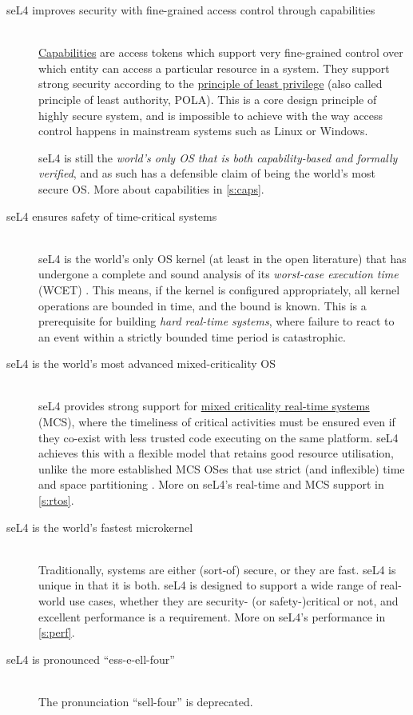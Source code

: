 \documentclass[english,a4paper,12pt]{report}
\newcommand{\Break}{\ \nopagebreak\\}
\begin{document}
\begin{description}
  \item[seL4 improves security with fine-grained access control
    through capabilities]\Break
    \href{https://en.wikipedia.org/wiki/Capability-based_security}{Capabilities}
    are access tokens which support very fine-grained control over which
    entity can access a particular resource in a system. They support
    strong security according to the
    \href{https://en.wikipedia.org/wiki/Principle_of_least_privilege}{principle
      of least privilege} (also called principle of least authority,
    POLA). This is a core design principle of highly secure system,
    and is impossible to achieve with the way access control happens
    in mainstream systems such as Linux or Windows.

    seL4 is still the \emph{world's only OS that is both
      capability-based and formally verified}, and as such has a
    defensible claim of being the world's most secure OS. More about capabilities
    in \autoref{s:caps}.

  \item[seL4 ensures safety of time-critical systems] \Break%
    seL4 is the world's only OS kernel (at least in the open
    literature) that has undergone a complete and sound analysis of
    its \emph{worst-case execution time} (WCET)
    \citep{Blackham_SCRH_11, Sewell_KH_17}. This means,
    if the kernel is configured appropriately, all kernel
    operations are bounded in time, and the bound is known. This is a
    prerequisite for building \emph{hard real-time systems}, where
    failure to react to an event within a strictly bounded time period
    is catastrophic.

  \item[seL4 is the world's most advanced mixed-criticality OS] \Break
    seL4 provides strong support for
    \href{https://en.wikipedia.org/wiki/Mixed_criticality}{mixed
      criticality real-time systems} (MCS), where the timeliness of critical
    activities must be ensured even if they co-exist with less trusted
    code executing on the same platform. seL4 achieves this with a
    flexible model that retains good resource utilisation, unlike the
    more established MCS OSes that use strict (and inflexible) time
    and space partitioning \citep{Lyons_MAH_18}. More on seL4's
    real-time and MCS support in \autoref{s:rtos}.

  \item[seL4 is the world's fastest microkernel] \Break
    Traditionally, systems are either (sort-of) secure, or they are
    fast. seL4 is unique in that it is both. seL4 is designed to
    support a wide range of
    real-world use cases, whether they are
    security- (or safety-)critical or not, and excellent performance
    is a requirement. More on seL4's
    performance in \autoref{s:perf}.

  \item[seL4 is pronounced ``ess-e-ell-four''] \Break
    The pronunciation ``sell-four'' is deprecated.
  \end{description}
\end{document}
